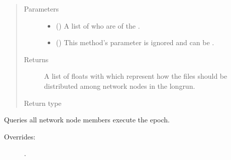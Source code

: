 \documentclass[letterpaper,10pt,english]{sphinxmanual}
\begin{document}
\begin{fulllineitems}
\begin{fulllineitems}
\begin{description}
\end{description}
\begin{quote}\begin{description}
\item[{Parameters}] \leavevmode\begin{itemize}
\item {} 
 (\sphinxstyleliteralemphasis{\sphinxupquote{{[}}}\sphinxstyleliteralemphasis{\sphinxupquote{{]}}}) \textendash{} A list of {\hyperref[\detokenize{app.domain:app.domain.network_nodes.Node.id}]{}} who are
{\hyperref[\detokenize{app.domain:app.domain.cluster_groups.Cluster.members}]{}} of the .

\item {} 
 (\sphinxstyleliteralemphasis{\sphinxupquote{{[}}}\sphinxstyleliteralemphasis{\sphinxupquote{{]}}}) \textendash{} This method’s parameter is ignored and can be .

\end{itemize}

\item[{Returns}] \leavevmode
A list of floats with which represent how the files should be
distributed among network nodes in the long\sphinxhyphen{}run.

\item[{Return type}] \leavevmode
{}

\end{description}\end{quote}

\end{fulllineitems}


\begin{fulllineitems}
\label{\detokenize{app.domain:app.domain.cluster_groups.SGClusterPerfect.nodes_execute}}
Queries all network node members execute the epoch.
\begin{description}
\item[{Overrides:}] \leavevmode
{\hyperref[\detokenize{app.domain:app.domain.cluster_groups.Cluster.nodes_execute}]{}}.


\end{description}
\end{fulllineitems}
\end{fulllineitems}
\end{document}
